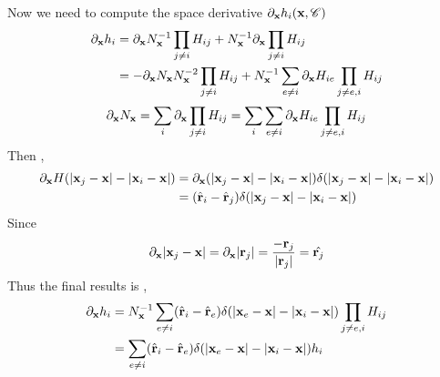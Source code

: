 Now we need to compute the space derivative $\partial_\textbf{x} h_i(\textbf{x},\mathscr{C})$ 
\begin{align*}
    \partial_\textbf{x} h_i
    &= 
    \partial_\textbf{x} N_\textbf{x}^{-1} \prod_{j\neq i} H_{ij}
    + N_\textbf{x}^{-1} \partial_\textbf{x} \prod_{j\neq i} H_{ij}\\
    &= 
    - \partial_\textbf{x} N_\textbf{x} N_\textbf{x}^{-2} \prod_{j\neq i} H_{ij}
    + N_\textbf{x}^{-1} \sum_{e \neq i} \partial_\textbf{x} H_{ie} \prod_{j\neq e,i} H_{ij}
\end{align*}
\begin{align*}
    \partial_\textbf{x} N_\textbf{x}
    = \sum_{i}
    \partial_\textbf{x} 
    \prod_{j\neq i}
    H_{ij}
    = \sum_{i}
    \sum_{e\neq i}
    \partial_\textbf{x} 
    H_{ie}
    \prod_{j\neq e,i}
    H_{ij}
\end{align*}
Then , 
\begin{align*}
    \partial_\textbf{x} H(|\textbf{x}_j - \textbf{x}| - |\textbf{x}_i - \textbf{x}|)
    &= \partial_\textbf{x} (|\textbf{x}_j - \textbf{x}| - |\textbf{x}_i - \textbf{x}|) 
    \delta(|\textbf{x}_j - \textbf{x}| - |\textbf{x}_i - \textbf{x}|)\\
    &= (\hat{\textbf{r}}_i - \hat{\textbf{r}}_j)
    \delta(|\textbf{x}_j - \textbf{x}| - |\textbf{x}_i - \textbf{x}|)
\end{align*}
Since 
\begin{equation*}
    \partial_\textbf{x} |\textbf{x}_j - \textbf{x}| 
    = \partial_\textbf{x} |\textbf{r}_j|
    = \frac{- \textbf{r}_j}{|\textbf{r}_j|}
    = \hat{\textbf{r}_j}
\end{equation*}
Thus the final results is , 
\begin{align*}
    \partial_\textbf{x} h_i
    &=
    N_\textbf{x}^{-1} \sum_{e \neq i} (\hat{\textbf{r}}_i - \hat{\textbf{r}}_e)
    \delta(|\textbf{x}_e - \textbf{x}| - |\textbf{x}_i - \textbf{x}|) \prod_{j\neq e,i} H_{ij}\\
    &=
    \sum_{e \neq i} (\hat{\textbf{r}}_i - \hat{\textbf{r}}_e)
    \delta(|\textbf{x}_e - \textbf{x}| - |\textbf{x}_i - \textbf{x}|) h_i
\end{align*}


